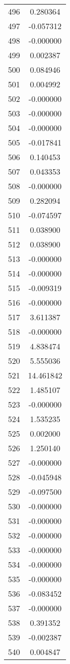 \documentclass[12pt]{article}
\begin{document}
\begin{longtable}{@{}cc@{}}
496 & 0.280364 \\
497 & -0.057312 \\
498 & -0.000000 \\
499 & 0.002387 \\
500 & 0.084946 \\
501 & 0.004992 \\
502 & -0.000000 \\
503 & -0.000000 \\
504 & -0.000000 \\
505 & -0.017841 \\
506 & 0.140453 \\
507 & 0.043353 \\
508 & -0.000000 \\
509 & 0.282094 \\
510 & -0.074597 \\
511 & 0.038900 \\
512 & 0.038900 \\
513 & -0.000000 \\
514 & -0.000000 \\
515 & -0.009319 \\
516 & -0.000000 \\
517 & 3.611387 \\
518 & -0.000000 \\
519 & 4.838474 \\
520 & 5.555036 \\
521 & 14.461842 \\
522 & 1.485107 \\
523 & -0.000000 \\
524 & 1.535235 \\
525 & 0.002000 \\
526 & 1.250140 \\
527 & -0.000000 \\
528 & -0.045948 \\
529 & -0.097500 \\
530 & -0.000000 \\
531 & -0.000000 \\
532 & -0.000000 \\
533 & -0.000000 \\
534 & -0.000000 \\
535 & -0.000000 \\
536 & -0.083452 \\
537 & -0.000000 \\
538 & 0.391352 \\
539 & -0.002387 \\
540 & 0.004847 \\

\end{longtable}
\end{document}
